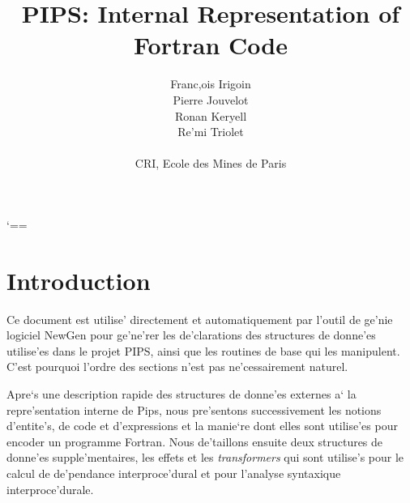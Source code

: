 
% 

\title{PIPS: Internal Representation of Fortran Code}
\author{Franc,ois Irigoin \\
        Pierre Jouvelot \\
    Ronan Keryell \\
        Re'mi Triolet\\
\\
        CRI, Ecole des Mines de Paris}

      {
        \catcode `==\active
        \gdef\domain{\medskip\par\noindent
          \bgroup
          \catcode `_ \other
          \catcode `= \active
          \def={\em{\rm \string=}}
          \tt\em\vraidomain}
        \gdef\vraidomain#1{#1\egroup\medskip\par}
        }


\renewcommand{\indexname}{Index}

\makeindex


\maketitle
\sloppy

\section*{Introduction}

Ce document est utilise' directement et automatiquement par l'outil
de ge'nie logiciel NewGen pour ge'ne'rer les de'clarations des structures
de donne'es utilise'es dans le projet PIPS, ainsi que les routines de
base qui les manipulent. C'est pourquoi l'ordre des sections n'est pas
ne'cessairement naturel.

Apre`s une description rapide des structures de donne'es externes a` la
repre'sentation interne de Pips, nous pre'sentons successivement les
notions d'entite's, de code et d'expressions et la manie`re dont elles
sont utilise'es pour encoder un programme Fortran. Nous de'taillons
ensuite deux structures de donne'es supple'mentaires, les effets et les
{\em transformers} qui sont utilise's pour le calcul de de'pendance
interproce'dural et pour l'analyse syntaxique interproce'durale.

